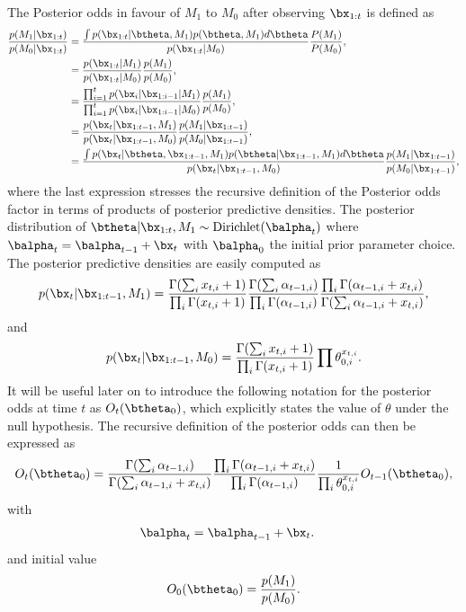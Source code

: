 \documentclass[11pt]{article}
\begin{document}
The Posterior odds in favour of $M_1$ to $M_0$ after observing $\bx_{1:t}$ is defined as
\begin{align}
  \label{eq:general_posterior_odds}
  \frac{p(M_1|\bx_{1:t})}{p(M_0|\bx_{1:t})}  &= \frac{\int p(\bx_{1:t}|\btheta,M_1)p(\btheta,M_1)d\btheta}{p(\bx_{1:t}|M_0)}\frac{P(M_1)}{P(M_0)},\\
                      &=\frac{p(\bx_{1:t}|M_1)}{p(\bx_{1:t}|M_0)}\frac{p(M_1)}{p(M_0)},\\
                      &=\frac{\prod_{i=1}^{t}p(\bx_i|\bx_{1:i-1}|M_1)}{\prod_{i=1}^{t}p(\bx_i|\bx_{1:i-1}|M_0)}\frac{p(M_1)}{p(M_0)},\\
                      &=\frac{p(\bx_t|\bx_{1:t-1},M_1)}{p(\bx_t|\bx_{1:t-1},M_0)} \frac{p(M_1|\bx_{1:t-1})}{p(M_0|\bx_{1:t-1})},\\
    &=\frac{\int p(\bx_t|\btheta,\bx_{1:t-1},M_1)p(\btheta|\bx_{1:t-1},M_1)d\btheta}{p(\bx_t|\bx_{1:t-1},M_0)}  \frac{p(M_1|\bx_{1:t-1})}{p(M_0|\bx_{1:t-1})} ,
\end{align}
where the last expression stresses the recursive definition of the Posterior odds factor in terms of products of posterior predictive densities.
The posterior distribution of $\btheta| \bx_{1:t}, M_1 \sim \text{Dirichlet}(\balpha_t)$ where $\balpha_t = \balpha_{t-1}+\bx_t$ with $\balpha_0$ the initial prior parameter choice.
The posterior predictive densities are easily computed as
\begin{equation}
  \label{eq:posterior_predictive_m1}
   p(\bx_t|\bx_{1:t-1},M_1) = \frac{ \Gamma(\sum_i x_{t,i}+ 1)}{\prod_i \Gamma(x_{t,i} + 1)} \frac{\Gamma(\sum_i \alpha_{t-1,i})}{\prod_i \Gamma(\alpha_{t-1,i})} \frac{\prod_i \Gamma(\alpha_{t-1,i} + x_{t,i})}{\Gamma(\sum_i \alpha_{t-1,i} + x_{t,i})},
\end{equation}
and
\begin{equation}
  \label{eq:posterior_predictive_m2}
   p(\bx_t|\bx_{1:t-1},M_0) = \frac{ \Gamma(\sum_i x_{t,i} + 1)}{\prod_i \Gamma(x_{t,i} + 1)} \prod \theta_{0,i}^{x_{t,i}}.
 \end{equation}
 It will be useful later on to introduce the following notation for the posterior odds at time $t$ as $O_t(\btheta_0)$, which explicitly states the value of $\theta$ under the null hypothesis.
The recursive definition of the posterior odds can then be expressed as
\begin{align}
  O_{t}(\btheta_0) &= \frac{\Gamma(\sum_i \alpha_{t-1,i})}{\Gamma(\sum_i \alpha_{t-1,i} +  x_{t,i})} \frac{\prod_i \Gamma(\alpha_{t-1,i} + x_{t,i})}{\prod_i \Gamma(\alpha_{t-1,i})} \frac{1}{\prod_i \theta_{0,i}^{x_{t,i}}}  O_{t-1}(\btheta_0),\\
\end{align}
with
\begin{align}
  \label{eq:alpha_update}
  \balpha_{t}&= \balpha_{t-1}+\bx_t.
\end{align}
and initial value
\begin{align}
  \label{eq:bayes_factor_seed}
O_0(\btheta_0) = \frac{p(M_1)}{p(M_0)}.
\end{align}
\end{document}
